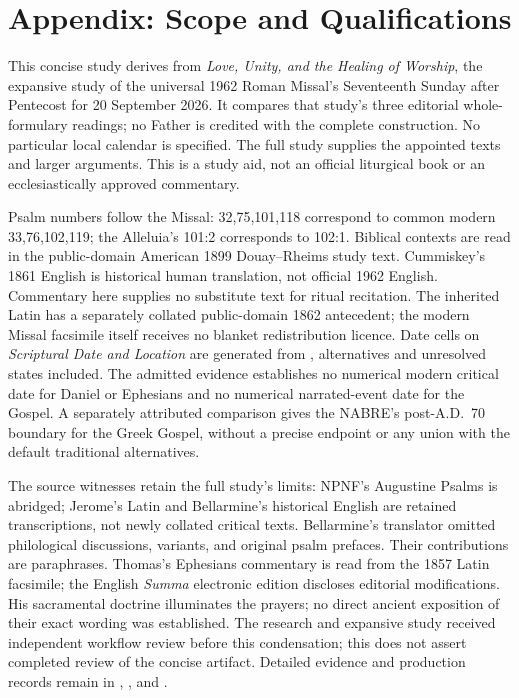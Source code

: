 \begingroup\small
\setlength{\parskip}{0.3em}
\section{Appendix: Scope and Qualifications}

This concise study derives from \emph{Love, Unity, and the Healing of Worship}, the expansive study of the universal 1962 Roman Missal's Seventeenth Sunday after Pentecost for 20 September 2026. It compares that study's three editorial whole-formulary readings; no Father is credited with the complete construction. No particular local calendar is specified. The full study supplies the appointed texts and larger arguments. This is a study aid, not an official liturgical book or an ecclesiastically approved commentary.

Psalm numbers follow the Missal: 32,75,101,118 correspond to common modern 33,76,102,119; the Alleluia's 101:2 corresponds to 102:1. Biblical contexts are read in the public-domain American 1899 Douay--Rheims study text. Cummiskey's 1861 English is historical human translation, not official 1962 English. Commentary here supplies no substitute text for ritual recitation. The inherited Latin has a separately collated public-domain 1862 antecedent; the modern Missal facsimile itself receives no blanket redistribution licence. Date cells on \emph{Scriptural Date and Location} are generated from , alternatives and unresolved states included. The admitted evidence establishes no numerical modern critical date for Daniel or Ephesians and no numerical narrated-event date for the Gospel. A separately attributed comparison gives the NABRE's post-A.D.~70 boundary for the Greek Gospel, without a precise endpoint or any union with the default traditional alternatives.

The source witnesses retain the full study's limits: NPNF's Augustine Psalms is abridged; Jerome's Latin and Bellarmine's historical English are retained transcriptions, not newly collated critical texts. Bellarmine's translator omitted philological discussions, variants, and original psalm prefaces. Their contributions are paraphrases. Thomas's Ephesians commentary is read from the 1857 Latin facsimile; the English \emph{Summa} electronic edition discloses editorial modifications. His sacramental doctrine illuminates the prayers; no direct ancient exposition of their exact wording was established. The research and expansive study received independent workflow review before this condensation; this does not assert completed review of the concise artifact. Detailed evidence and production records remain in , , and .

